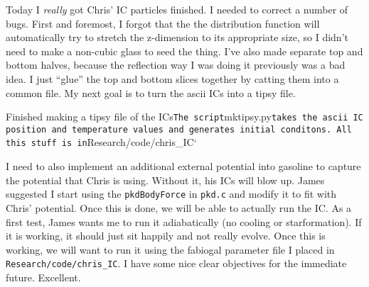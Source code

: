 \documentclass[11pt,letterpaper]{article}
\begin{document}
Today I \emph{really} got Chris' IC particles finished. I needed to
correct a number of bugs. First and foremost, I forgot that the the
distribution function will automatically try to stretch the z-dimension
to its appropriate size, so I didn't need to make a non-cubic glass to
seed the thing. I've also made separate top and bottom halves, because
the reflection way I was doing it previously was a bad idea. I just
``glue'' the top and bottom slices together by catting them into a
common file. My next goal is to turn the ascii ICs into a tipsy file.

Finished making a tipsy file of the
ICs\texttt{The script}mktipsy.py\texttt{takes the ascii IC position and temperature values and generates initial  conditons.  All this stuff is in}Research/code/chris\_IC`

I need to also implement an additional external potential into gasoline
to capture the potential that Chris is using. Without it, his ICs will
blow up. James suggested I start using the \texttt{pkdBodyForce} in
\texttt{pkd.c} and modify it to fit with Chris' potential. Once this is
done, we will be able to actually run the IC. As a first test, James
wants me to run it adiabatically (no cooling or starformation). If it is
working, it should just sit happily and not really evolve. Once this is
working, we will want to run it using the fabiogal parameter file I
placed in \texttt{Research/code/chris\_IC}. I have some nice clear
objectives for the immediate future. Excellent.
\end{document}
